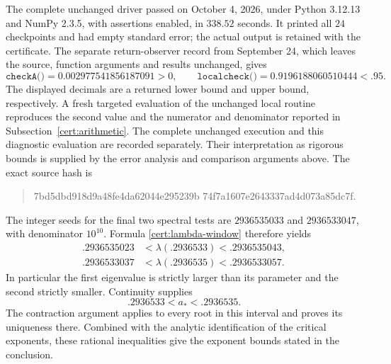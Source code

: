 \documentclass[11pt,a4paper]{article}
\numberwithin{equation}{section}
\theoremstyle{definition}
\theoremstyle{remark}
\begin{document}
The complete unchanged driver passed on October 4, 2026, under
Python 3.12.13 and NumPy 2.3.5, with assertions enabled, in
$338.52$ seconds.  It printed all $24$ checkpoints and had empty
standard error; the actual output is retained with the certificate.
The separate return-observer record from September 24, which leaves
the source, function arguments and results unchanged, gives
\[
 \texttt{checkA()}=0.002977541856187091>0,\qquad
 \texttt{localcheck()}=0.9196188060510444<.95.
\]
The displayed decimals are a returned lower bound and upper bound,
respectively.  A fresh targeted evaluation of the unchanged local routine
reproduces the second value and the numerator and denominator reported
in Subsection~\ref{cert:arithmetic}.  The complete unchanged execution
and this diagnostic evaluation are recorded separately.
Their interpretation as rigorous bounds is supplied by the error
analysis and comparison arguments above.  The exact source hash is
\begin{quote}\ttfamily\small
7bd5dbd918d9a48fe4da62044e295239b\allowbreak
74f7a1607e2643337ad4d073a85dc7f.
\end{quote}
The integer seeds for the final two spectral tests are $2936535033$ and
$2936533047$, with denominator $10^{10}$.  Formula
\eqref{cert:lambda-window} therefore yields
\begin{align*}
 .2936535023&<\lambda(.2936533)<.2936535043,\\
 .2936533037&<\lambda(.2936535)<.2936533057.
\end{align*}
In particular the first eigenvalue is strictly larger than its parameter and
the second strictly smaller.  Continuity supplies
\[
 .2936533<a_*<.2936535.
\]
The contraction argument applies to every root in this interval and proves
its uniqueness there.  Combined with the analytic identification of the
critical exponents, these rational inequalities give the exponent bounds
stated in the conclusion.
\end{document}
